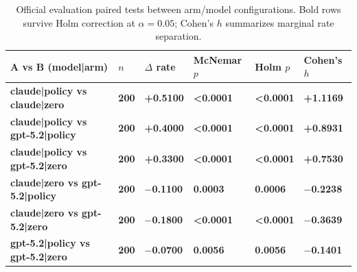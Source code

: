 \begin{table}[t]
\caption{Official evaluation paired tests between arm/model configurations. Bold rows survive Holm correction at $\alpha=0.05$; Cohen's $h$ summarizes marginal rate separation.}
\label{tab:evaluation_pairwise_tests}
\centering
\small
\setlength{\tabcolsep}{4pt}
\begin{tabularx}{\textwidth}{@{}>{\raggedright\arraybackslash}X>{\centering\arraybackslash}p{}>{\centering\arraybackslash}p{}>{\centering\arraybackslash}p{}>{\centering\arraybackslash}p{}>{\centering\arraybackslash}p{}@{}}
\toprule
A vs B (model|arm) & $n$ & $\Delta$ rate & McNemar $p$ & Holm $p$ & Cohen's $h$ \\
\midrule
\textbf{claude|policy vs claude|zero} & \textbf{200} & \textbf{+0.5100} & \textbf{\textless{}0.0001} & \textbf{\textless{}0.0001} & \textbf{+1.1169} \\
\textbf{claude|policy vs gpt-5.2|policy} & \textbf{200} & \textbf{+0.4000} & \textbf{\textless{}0.0001} & \textbf{\textless{}0.0001} & \textbf{+0.8931} \\
\textbf{claude|policy vs gpt-5.2|zero} & \textbf{200} & \textbf{+0.3300} & \textbf{\textless{}0.0001} & \textbf{\textless{}0.0001} & \textbf{+0.7530} \\
\textbf{claude|zero vs gpt-5.2|policy} & \textbf{200} & \textbf{$-$0.1100} & \textbf{0.0003} & \textbf{0.0006} & \textbf{$-$0.2238} \\
\textbf{claude|zero vs gpt-5.2|zero} & \textbf{200} & \textbf{$-$0.1800} & \textbf{\textless{}0.0001} & \textbf{\textless{}0.0001} & \textbf{$-$0.3639} \\
\textbf{gpt-5.2|policy vs gpt-5.2|zero} & \textbf{200} & \textbf{$-$0.0700} & \textbf{0.0056} & \textbf{0.0056} & \textbf{$-$0.1401} \\
\bottomrule
\end{tabularx}
\end{table}
